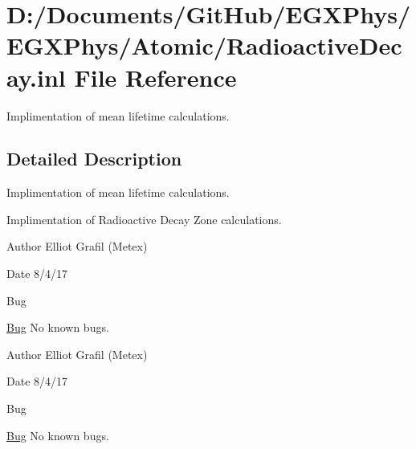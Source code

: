 \hypertarget{_radioactive_decay_8inl}{}\section{D\+:/\+Documents/\+Git\+Hub/\+E\+G\+X\+Phys/\+E\+G\+X\+Phys/\+Atomic/\+Radioactive\+Decay.inl File Reference}
\label{_radioactive_decay_8inl}


Implimentation of mean lifetime calculations.  




\subsection{Detailed Description}
Implimentation of mean lifetime calculations. 

Implimentation of Radioactive Decay Zone calculations.

\begin{DoxyAuthor}{Author}
Elliot Grafil (Metex) 
\end{DoxyAuthor}
\begin{DoxyDate}{Date}
8/4/17 
\end{DoxyDate}
\begin{DoxyRefDesc}{Bug}
\item[\hyperlink{bug__bug000026}{Bug}]No known bugs. \end{DoxyRefDesc}


\begin{DoxyAuthor}{Author}
Elliot Grafil (Metex) 
\end{DoxyAuthor}
\begin{DoxyDate}{Date}
8/4/17 
\end{DoxyDate}
\begin{DoxyRefDesc}{Bug}
\item[\hyperlink{bug__bug000028}{Bug}]No known bugs. \end{DoxyRefDesc}
